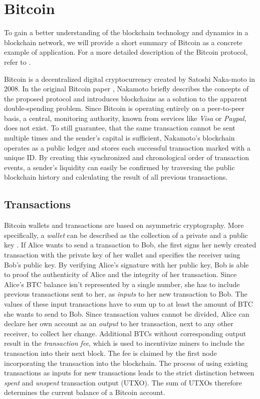 \documentclass[a4paper,12pt,twoside]{report}
\begin{document}
\section{Bitcoin} \label{bitcoin}
To gain a better understanding of the blockchain technology and dynamics in a blockchain network, we will provide a short summary of Bitcoin as a concrete example of application. For a more detailed description of the Bitcoin protocol, refer to \cite{nakamoto2008bitcoin,antonopoulos2017mastering,okupski2014bitcoin}.

 Bitcoin is a decentralized digital cryptocurrency created by Satoshi Naka-moto in 2008. In the original Bitcoin paper \cite{nakamoto2008bitcoin}, Nakamoto briefly describes the concepts of the proposed protocol and introduces blockchains as a solution to the apparent double-spending problem. Since Bitcoin is operating entirely on a peer-to-peer basis, a central, monitoring authority, known from services like \textit{Visa} or \textit{Paypal}, does not exist. To still guarantee, that the same transaction cannot be sent multiple times and the sender's capital is sufficient, Nakamoto's blockchain operates as a public ledger and stores each successful transaction marked with a unique ID. By creating this synchronized and chronological order of transaction events, a sender's liquidity can easily be confirmed by traversing the public blockchain history and calculating the result of all previous transactions. \cite{nakamoto2008bitcoin,bitcoinwiki}

\subsection{Transactions}
Bitcoin wallets and transactions are based on asymmetric cryptography. More specifically, a \textit{wallet} can be described as the collection of a private and a public key \cite{okupski2014bitcoin}. If Alice wants to send a transaction to Bob, she first signs her newly created transaction with the private key of her wallet and specifies the receiver using Bob's public key. By verifying Alice's signature with her public key, Bob is able to proof the authenticity of Alice and the integrity of her transaction. Since Alice's BTC balance isn't represented by a single number, she has to include previous transactions sent to her, as \textit{inputs} to her new transaction to Bob. The values of these input transactions have to sum up to at least the amount of BTC she wants to send to Bob. Since transaction values cannot be divided, Alice can declare her own account as an \textit{output} to her transaction, next to any other receiver, to collect her change. Additional BTCs without corresponding output result in the \textit{transaction fee}, which is used to incentivize miners to include the transaction into their next block. The fee is claimed by the first node incorporating the transaction into the blockchain. The process of using existing transactions as inputs for new transactions leads to the strict distinction between \textit{spent} and \textit{unspent} transaction output (UTXO). The sum of UTXOs therefore determines the current balance of a Bitcoin account.
\end{document}

